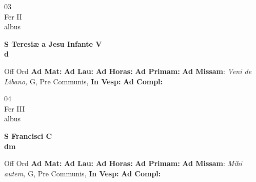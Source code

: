 \documentclass[10pt, openany]{book}
\begin{document}
    \begin{center}
        \begin{minipage}{3.5in}
            \vspace{2em}
            \begin{minipage}{0.5in}
                {\Huge 03} \\
                {\normalsize Fer II} \\
                {\normalsize albus}
            \end{minipage}
            \begin{minipage}{3.0in}
                \textbf{ \large S Teresiæ a Jesu Infante V \\
                \textnormal{\normalsize d}} \\ 
            \end{minipage}
            \begin{justify}Off Ord
                \textbf{Ad Mat: }
                \textbf{Ad Lau: }
                \textbf{Ad Horas: }
                \textbf{Ad Primam: }\textbf{Ad Missam}: \textit{Veni de Libano,} G, Pre Communis,  
                \textbf{In Vesp: }
                \textbf{Ad Compl: }
            \end{justify}
        \end{minipage}
    \end{center}

    \begin{center}
        \begin{minipage}{3.5in}
            \vspace{2em}
            \begin{minipage}{0.5in}
                {\Huge 04} \\
                {\normalsize Fer III} \\
                {\normalsize albus}
            \end{minipage}
            \begin{minipage}{3.0in}
                \textbf{ \large S Francisci C \\
                \textnormal{\normalsize dm}} \\ 
            \end{minipage}
            \begin{justify}Off Ord
                \textbf{Ad Mat: }
                \textbf{Ad Lau: }
                \textbf{Ad Horas: }
                \textbf{Ad Primam: }\textbf{Ad Missam}: \textit{Mihi autem,} G, Pre Communis,  
                \textbf{In Vesp: }
                \textbf{Ad Compl: }
            \end{justify}
        \end{minipage}
    \end{center}
\end{document}
